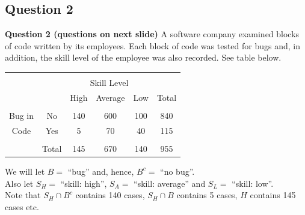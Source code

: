 \documentclass[compress]{beamer}        %
\makeatletter
\newcommand{\tcb}{\textcolor{beamer@blendedblue}}
\makeatother
\begin{document}
\subsection{Question 2}
\begin{frame}{\bf \tcb{Question 2 (questions on next slide)}}
A software company examined blocks of code written by its employees. Each block of code was tested for bugs and, in addition, the skill level of the employee was also recorded. See table below.
\begin{center}
\begin{tabular}{|cc|ccc|c|}
\hline
&&&&&\\[-0.4cm]
    && \multicolumn{3}{|c|}{Skill Level} &  \\
    && High & Average & Low & Total \\
\hline
&&&&&\\[-0.4cm]
Bug in   & No    &  140 &   600  & 100 & 840 \\
Code & Yes   &    5 &    70  &  40 & 115 \\
\hline
&&&&&\\[-0.4cm]
&Total &  145 &   670  & 140 & 955 \\
\hline
\end{tabular}
\end{center}

We will let $B =$ ``bug'' and, hence, $B^c =$ ``no bug''.\\[0.2cm]
Also let $S_H = $ ``skill: high'', $S_A = $ ``skill: average'' and $S_L =$ ``skill: low''.\\[0.5cm]

Note that $S_H \cap B^c$ contains 140 cases, $S_H \cap B$ contains 5 cases, $H$ contains 145 cases etc.

\end{frame}
\end{document}

